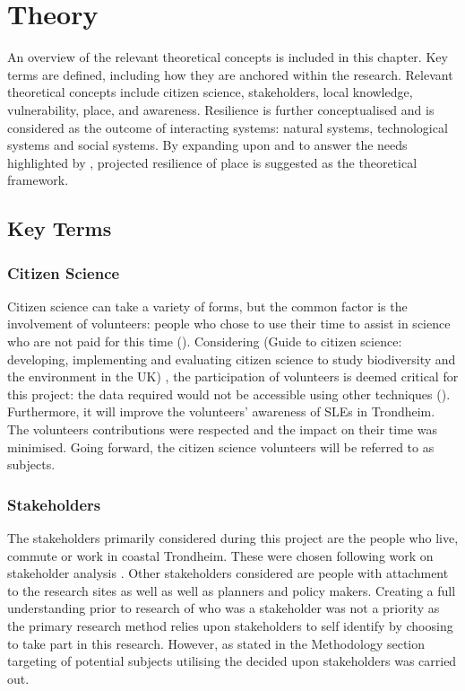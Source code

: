
\chapter{Theory}


An overview of the relevant theoretical concepts is included in this chapter. Key terms are defined, including how they are anchored within the research. Relevant theoretical concepts include citizen science, stakeholders, local knowledge, vulnerability, place, and awareness. Resilience is further conceptualised and is considered as the outcome of interacting systems: natural systems, technological systems and social systems. By expanding upon \cite{cutter_place-based_2008} and \cite{cutter_community_2020} to answer the needs highlighted by \cite{rasanen_conceptualizing_2020}, projected resilience of place is suggested as the theoretical framework.

\section{Key Terms}


\subsection{Citizen Science}
Citizen science can take a variety of forms, but the common factor is the involvement of volunteers: people who chose to use their time to assist in science who are not paid for this time (\cite{pocock_choosing_2014}). Considering \cite{tweddle_guide_2012} (Guide to citizen science: developing, implementing and evaluating citizen science to study biodiversity and the environment in the UK) , the participation of volunteers is deemed critical for this project: the data required would not be accessible using other techniques (\cite{tweddle_guide_2012}). Furthermore, it will improve the volunteers' awareness of SLEs in Trondheim.  The volunteers contributions were respected and the impact on their time was minimised. Going forward, the citizen science volunteers will be referred to as subjects. 

\subsection{Stakeholders}
The stakeholders primarily considered during this project are the people who live, commute or work in coastal Trondheim. These were chosen following \cite{reed_stakeholder_2008} work on stakeholder analysis . Other stakeholders considered are people with attachment to the research sites as well as well as planners and policy makers. Creating a full understanding prior to research of who was a stakeholder was not a priority as the primary research method relies upon stakeholders to self identify by choosing to take part in this research. However, as stated in the Methodology section targeting of potential subjects utilising the decided upon stakeholders was carried out. 


